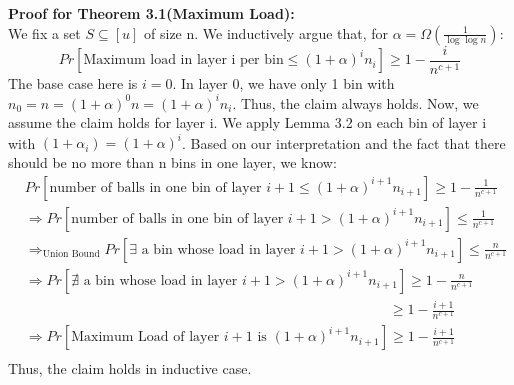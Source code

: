 \documentclass[a4paper, english]{paper}
\begin{document}
	\noindent\textbf{Proof for Theorem 3.1(Maximum Load):} \\
\quad	We fix a set $S\subseteq[u]$ of size n. We inductively argue that, for $\alpha = \Omega(\frac1{\log\log n})$:
	$$Pr\left[\text{Maximum load in layer i per bin}\le(1+\alpha)^in_i\right]\ge1-\frac i{n^{c+1}}$$
\quad	The base case here is $i = 0$. In layer 0, we have only 1 bin with $n_0=n=(1+\alpha)^0n = (1+\alpha)^in_i$. Thus, the claim always holds. Now, we assume the claim holds for layer i. We apply Lemma 3.2 on each bin of layer i with $(1+\alpha_i) = (1+\alpha)^i$. Based on our interpretation and the fact that there should be no more than n bins in one layer, we know:
\begin{align*}
&Pr\left[ \text{number of balls in one bin of layer }i+1\le (1+\alpha)^{i+1}n_{i+1}\right] \ge 1-\frac1{n^{c+1}}\\ 
&\Rightarrow Pr\left[ \text{number of balls in one bin of layer }i+1> (1+\alpha)^{i+1}n_{i+1}\right] \le \frac1{n^{c+1}}\\
&\Rightarrow_{\text{Union Bound}} Pr\left[ \exists \text{ a bin whose load in layer }i+1> (1+\alpha)^{i+1}n_{i+1}\right] \le \frac n{n^{c+1}}\\
&\Rightarrow Pr\left[ \nexists \text{ a bin whose load in layer }i+1> (1+\alpha)^{i+1}n_{i+1}\right] \ge 1-\frac n{n^{c+1}}\\
&\qquad\qquad\qquad\qquad\qquad\qquad\qquad\qquad\qquad\qquad\qquad\qquad\qquad\ge 1-\frac {i+1}{n^{c+1}}\\
&\Rightarrow Pr\left[ \text{Maximum Load of layer }i+1 \text{ is } (1+\alpha)^{i+1}n_{i+1}\right] \ge 1-\frac {i+1}{n^{c+1}}\\
\end{align*}
\quad  \text{ }Thus, the claim holds in inductive case.\\
\end{document}
